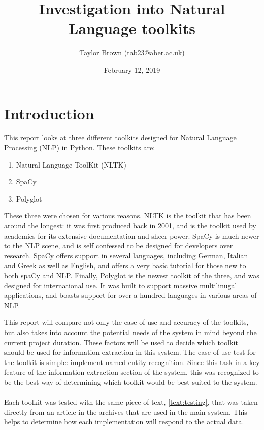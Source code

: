 \documentclass[11pt,a4paper]{article}
\title{Investigation into Natural Language toolkits}
\author{Taylor Brown (tab23@aber.ac.uk)}
\date{February 12, 2019}
\begin{document}
\maketitle

\section{Introduction}
This report looks at three different toolkits designed for Natural Language Processing (NLP) in Python. These toolkits are:
\begin{enumerate}

	\item Natural Language ToolKit (NLTK)
	\item SpaCy
	\item Polyglot

\end{enumerate}

These three were chosen for various reasons. NLTK is the toolkit that has been around the longest: it was first produced back in 2001, and is the toolkit used by academics for its extensive documentation and sheer power. SpaCy is much newer to the NLP scene, and is self confessed to be designed for developers over research\cite{spacy}. SpaCy offers support in several languages, including German, Italian and Greek as well as English, and offers a very basic tutorial for those new to both spaCy and NLP. Finally, Polyglot is the newest toolkit of the three, and was designed for international use. It was built to support massive multilinugal applications, and boasts support for over a hundred languages in various areas of NLP. 

This report will compare not only the ease of use and accuracy of the toolkits, but also takes into account the potential needs of the system in mind beyond the current project duration. These factors will be used to decide which toolkit should be used for information extraction in this system. The ease of use test for the toolkit is simple: implement named entity recognition. Since this task in a key feature of the information extraction section of the system, this was recognized to be the best way of determining which toolkit would be best suited to the system.
\\\\
Each toolkit was tested with the same piece of text, \ref{text:testing}, that was taken directly from an article in the archives that are used in the main system. This helps to determine how each implementation will respond to the actual data.
\end{document}
